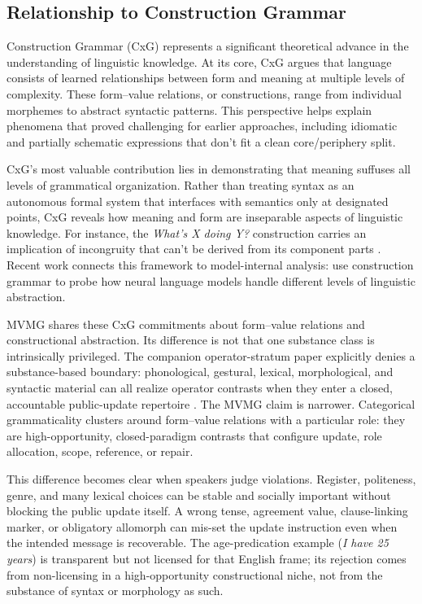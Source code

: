 \documentclass[12pt,letterpaper]{article}
\newcommand{\mention}[1]{\textit{#1}}
\begin{document}
\subsection{Relationship to Construction Grammar}

Construction Grammar (CxG) \autocite{fillmore1988mechanisms, fillmore1988, kay1999grammatical, goldberg1995constructions, goldberg2019, sag2012sign} represents a significant theoretical advance in the understanding of linguistic knowledge. At its core, CxG argues that language consists of learned relationships between form and meaning at multiple levels of complexity. These form--value relations, or constructions, range from individual morphemes to abstract syntactic patterns. This perspective helps explain phenomena that proved challenging for earlier approaches, including idiomatic and partially schematic expressions that don't fit a clean core/periphery split.

CxG's most valuable contribution lies in demonstrating that meaning suffuses all levels of grammatical organization. Rather than treating syntax as an autonomous formal system that interfaces with semantics only at designated points, CxG reveals how meaning and form are inseparable aspects of linguistic knowledge. For instance, the \mention{What's X doing Y?} construction carries an implication of incongruity that can't be derived from its component parts \autocite{kay1999grammatical}. Recent work connects this framework to model-internal analysis: \textcite{weissweiler2023construction} use construction grammar to probe how neural language models handle different levels of linguistic abstraction.

MVMG shares these CxG commitments about form--value relations and constructional abstraction. Its difference is not that one substance class is intrinsically privileged. The companion operator-stratum paper explicitly denies a substance-based boundary: phonological, gestural, lexical, morphological, and syntactic material can all realize operator contrasts when they enter a closed, accountable public-update repertoire \autocite{reynolds2026operators}. The MVMG claim is narrower. Categorical grammaticality clusters around form--value relations with a particular role: they are high-opportunity, closed-paradigm contrasts that configure update, role allocation, scope, reference, or repair.

This difference becomes clear when speakers judge violations. Register, politeness, genre, and many lexical choices can be stable and socially important without blocking the public update itself. A wrong tense, agreement value, clause-linking marker, or obligatory allomorph can mis-set the update instruction even when the intended message is recoverable. The age-predication example (\mention{I have 25 years}) is transparent but not licensed for that English frame; its rejection comes from non-licensing in a high-opportunity constructional niche, not from the substance of syntax or morphology as such.
\end{document}
